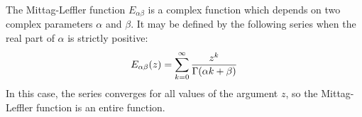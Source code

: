 \documentclass[12pt]{article}
\begin{document}
The Mittag-Leffler function $E_{\alpha \beta}$ is a complex function which depends on two complex parameters $\alpha$ and $\beta$.  It may be defined by the following series when the real part of $\alpha$ is strictly positive:
 $$E_{\alpha \beta} (z) = \sum_{k=0}^\infty {z^k \over \Gamma (\alpha k + \beta)}$$
In this case, the series converges for all values of the argument $z$, so the Mittag-Leffler function is an entire function.
\end{document}
